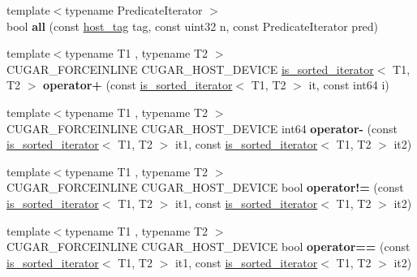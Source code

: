 \begin{DoxyCompactItemize}
{\footnotesize template$<$typename Predicate\+Iterator $>$ }\\bool {\bfseries all} (const \hyperlink{structcugar_1_1host__tag}{host\+\_\+tag} tag, const uint32 n, const Predicate\+Iterator pred)
\item 
\mbox{\label{namespacecugar_ac9a6578c5bd8b048b9a72f2d3133af36}} 
{\footnotesize template$<$typename T1 , typename T2 $>$ }\\C\+U\+G\+A\+R\+\_\+\+F\+O\+R\+C\+E\+I\+N\+L\+I\+NE C\+U\+G\+A\+R\+\_\+\+H\+O\+S\+T\+\_\+\+D\+E\+V\+I\+CE \hyperlink{structcugar_1_1is__sorted__iterator}{is\+\_\+sorted\+\_\+iterator}$<$ T1, T2 $>$ {\bfseries operator+} (const \hyperlink{structcugar_1_1is__sorted__iterator}{is\+\_\+sorted\+\_\+iterator}$<$ T1, T2 $>$ it, const int64 i)
\item 
\mbox{\label{namespacecugar_a50252a82a3130cbd05c7e68d8ad7da67}} 
{\footnotesize template$<$typename T1 , typename T2 $>$ }\\C\+U\+G\+A\+R\+\_\+\+F\+O\+R\+C\+E\+I\+N\+L\+I\+NE C\+U\+G\+A\+R\+\_\+\+H\+O\+S\+T\+\_\+\+D\+E\+V\+I\+CE int64 {\bfseries operator-\/} (const \hyperlink{structcugar_1_1is__sorted__iterator}{is\+\_\+sorted\+\_\+iterator}$<$ T1, T2 $>$ it1, const \hyperlink{structcugar_1_1is__sorted__iterator}{is\+\_\+sorted\+\_\+iterator}$<$ T1, T2 $>$ it2)
\item 
\mbox{\label{namespacecugar_ae6275f5fc6d3d4f7ea258c033d906d09}} 
{\footnotesize template$<$typename T1 , typename T2 $>$ }\\C\+U\+G\+A\+R\+\_\+\+F\+O\+R\+C\+E\+I\+N\+L\+I\+NE C\+U\+G\+A\+R\+\_\+\+H\+O\+S\+T\+\_\+\+D\+E\+V\+I\+CE bool {\bfseries operator!=} (const \hyperlink{structcugar_1_1is__sorted__iterator}{is\+\_\+sorted\+\_\+iterator}$<$ T1, T2 $>$ it1, const \hyperlink{structcugar_1_1is__sorted__iterator}{is\+\_\+sorted\+\_\+iterator}$<$ T1, T2 $>$ it2)
\item 
\mbox{\label{namespacecugar_a6f73c71f0a6f07438a92426797ab7fa0}} 
{\footnotesize template$<$typename T1 , typename T2 $>$ }\\C\+U\+G\+A\+R\+\_\+\+F\+O\+R\+C\+E\+I\+N\+L\+I\+NE C\+U\+G\+A\+R\+\_\+\+H\+O\+S\+T\+\_\+\+D\+E\+V\+I\+CE bool {\bfseries operator==} (const \hyperlink{structcugar_1_1is__sorted__iterator}{is\+\_\+sorted\+\_\+iterator}$<$ T1, T2 $>$ it1, const \hyperlink{structcugar_1_1is__sorted__iterator}{is\+\_\+sorted\+\_\+iterator}$<$ T1, T2 $>$ it2)

\end{DoxyCompactItemize}
